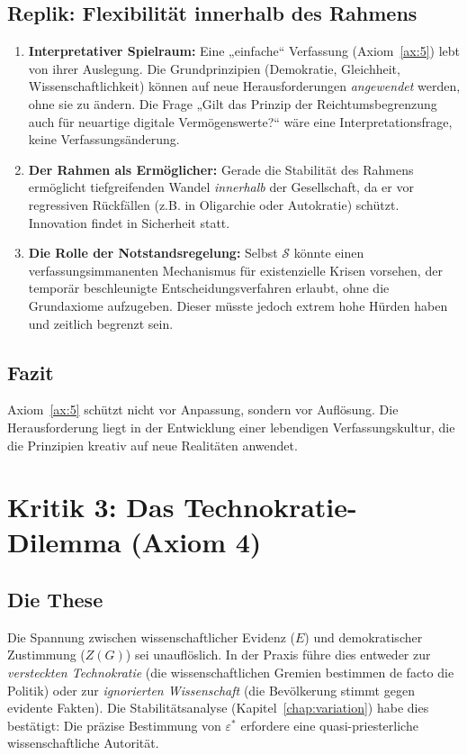 \subsection{Replik: Flexibilität innerhalb des Rahmens}
\begin{enumerate}
    \item \textbf{Interpretativer Spielraum:} Eine „einfache“ Verfassung (Axiom~\ref{ax:5}) lebt von ihrer Auslegung. Die Grundprinzipien (Demokratie, Gleichheit, Wissenschaftlichkeit) können auf neue Herausforderungen \emph{angewendet} werden, ohne sie zu ändern. Die Frage „Gilt das Prinzip der Reichtumsbegrenzung auch für neuartige digitale Vermögenswerte?“ wäre eine Interpretationsfrage, keine Verfassungsänderung.
    \item \textbf{Der Rahmen als Ermöglicher:} Gerade die Stabilität des Rahmens ermöglicht tiefgreifenden Wandel \emph{innerhalb} der Gesellschaft, da er vor regressiven Rückfällen (z.B. in Oligarchie oder Autokratie) schützt. Innovation findet in Sicherheit statt.
    \item \textbf{Die Rolle der Notstandsregelung:} Selbst $\mathcal{S}$ könnte einen verfassungsimmanenten Mechanismus für existenzielle Krisen vorsehen, der temporär beschleunigte Entscheidungsverfahren erlaubt, ohne die Grundaxiome aufzugeben. Dieser müsste jedoch extrem hohe Hürden haben und zeitlich begrenzt sein.
\end{enumerate}

\subsection{Fazit}
Axiom~\ref{ax:5} schützt nicht vor Anpassung, sondern vor Auflösung. Die Herausforderung liegt in der Entwicklung einer lebendigen Verfassungskultur, die die Prinzipien kreativ auf neue Realitäten anwendet.

\section{Kritik 3: Das Technokratie-Dilemma (Axiom 4)}

\subsection{Die These}
Die Spannung zwischen wissenschaftlicher Evidenz ($E$) und demokratischer Zustimmung ($Z(G)$) sei unauflöslich. In der Praxis führe dies entweder zur \emph{versteckten Technokratie} (die wissenschaftlichen Gremien bestimmen de facto die Politik) oder zur \emph{ignorierten Wissenschaft} (die Bevölkerung stimmt gegen evidente Fakten). Die Stabilitätsanalyse (Kapitel~\ref{chap:variation}) habe dies bestätigt: Die präzise Bestimmung von $\varepsilon^*$ erfordere eine quasi-priesterliche wissenschaftliche Autorität.


